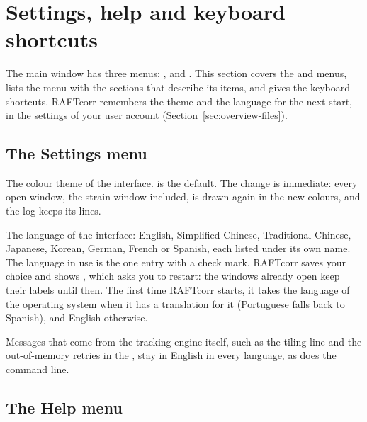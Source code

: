 \section{Settings, help and keyboard shortcuts}
\label{sec:settings}

The main window has three menus: ,  and . This section covers the
 and  menus, lists the  menu with the sections that describe its
items, and gives the keyboard shortcuts. RAFTcorr remembers the theme and the language for the next start, in
the settings of your user account (Section~\ref{sec:overview-files}).

\subsection{The Settings menu}
\label{sec:settings-menu}

\begin{description}[leftmargin=0.6cm,style=nextline]
  \item[\menuthree{Settings}{Theme}{Dark} or \ui{Light}]
    The colour theme of the interface.  is the default. The change is immediate: every
    open window, the strain window included, is drawn again in the new colours, and the log keeps
    its lines.
  \item[\menu{Settings}{Language}]
    The language of the interface: English, Simplified Chinese, Traditional Chinese, Japanese,
    Korean, German, French or Spanish, each listed under its own name. The language in use is the
    one entry with a check mark. RAFTcorr saves your choice
    and shows , which asks you to restart: the windows already open keep
    their labels until then. The first time RAFTcorr starts, it takes the language of the
    operating system when it has a translation for it (Portuguese falls back to Spanish), and
    English otherwise.
\end{description}

Messages that come from the tracking engine itself, such as the tiling line and the
out-of-memory retries in the , stay in English in every language, as does the command
line.

\subsection{The Help menu}
\label{sec:settings-help}

